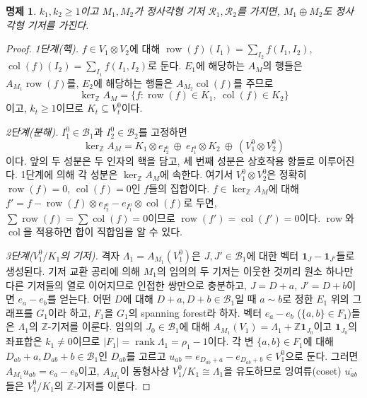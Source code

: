 \documentclass[11pt,a4paper]{article}
\theoremstyle{plain}
\newtheorem{proposition}[theorem]{명제}
\theoremstyle{definition}
\newcommand{\Z}{\mathbb Z}
\newcommand{\AM}{A_M}
\newcommand{\kerZ}{\ker_{\Z}\!A_M}
\newcommand{\bs}{\mathcal B}
\newcommand{\rank}{\operatorname{rank}}
\newcommand{\ind}{\mathbf 1}
\begin{document}
\begin{proposition}\label{prop:dsum}
$k_1,k_2\ge1$이고 $M_1,M_2$가 정사각형 기저 $\mathcal R_1,\mathcal R_2$를 가지면, $M_1\oplus M_2$도 정사각형 기저를 가진다.
\end{proposition}
\begin{proof}
\emph{1단계(핵).} $f\in V_1\otimes V_2$에 대해 $\operatorname{row}(f)(I_1)=\sum_{I_2}f(I_1,I_2)$, $\operatorname{col}(f)(I_2)=\sum_{I_1}f(I_1,I_2)$로 둔다. $E_1$에 해당하는 $\AM$의 행들은 $A_{M_1}\operatorname{row}(f)$를, $E_2$에 해당하는 행들은 $A_{M_2}\operatorname{col}(f)$를 주므로
\[
\kerZ=\{f:\operatorname{row}(f)\in K_1,\ \operatorname{col}(f)\in K_2\}
\]
이고, $k_t\ge1$이므로 $K_t\subseteq V_t^0$이다.

\emph{2단계(분해).} $I_1^0\in\bs_1$과 $I_2^0\in\bs_2$를 고정하면
\[
\kerZ=K_1\otimes e_{I_2^0}\ \oplus\ e_{I_1^0}\otimes K_2\ \oplus\ (V_1^0\otimes V_2^0)
\]
이다. 앞의 두 성분은 두 인자의 핵을 담고, 세 번째 성분은 상호작용 항들로 이루어진다. 1단계에 의해 각 성분은 $\kerZ$에 속한다. 여기서 $V_1^0\otimes V_2^0$은 정확히 $\operatorname{row}(f)=0$, $\operatorname{col}(f)=0$인 $f$들의 집합이다. $f\in\kerZ$에 대해 $f'=f-\operatorname{row}(f)\otimes e_{I_2^0}-e_{I_1^0}\otimes\operatorname{col}(f)$로 두면, $\sum\operatorname{row}(f)=\sum\operatorname{col}(f)=0$이므로 $\operatorname{row}(f')=\operatorname{col}(f')=0$이다. $\operatorname{row}$와 $\operatorname{col}$을 적용하면 합이 직합임을 알 수 있다.

\emph{3단계($V_1^0/K_1$의 기저).} 격자 $\Lambda_1=A_{M_1}(V_1^0)$은 $J,J'\in\bs_1$에 대한 벡터 $\ind_J-\ind_{J'}$들로 생성된다. 기저 교환 공리에 의해 $M_1$의 임의의 두 기저는 이웃한 것끼리 원소 하나만 다른 기저들의 열로 이어지므로 인접한 쌍만으로 충분하고, $J=D+a$, $J'=D+b$이면 $e_a-e_b$를 얻는다. 어떤 $D$에 대해 $D+a,D+b\in\bs_1$일 때 $a\sim b$로 정한 $E_1$ 위의 그래프를 $G_1$이라 하고, $F_1$을 $G_1$의 spanning forest라 하자. 벡터 $e_a-e_b$ ($\{a,b\}\in F_1$)들은 $\Lambda_1$의 $\Z$\nobreakdash-기저를 이룬다. 임의의 $J_0\in\bs_1$에 대해 $A_{M_1}(V_1)=\Lambda_1+\Z\ind_{J_0}$이고 $\ind_{J_0}$의 좌표합은 $k_1\neq0$이므로 $|F_1|=\rank\Lambda_1=\rho_1-1$이다. 각 변 $\{a,b\}\in F_1$에 대해 $D_{ab}+a,D_{ab}+b\in\bs_1$인 $D_{ab}$를 고르고 $u_{ab}=e_{D_{ab}+a}-e_{D_{ab}+b}\in V_1^0$으로 둔다. 그러면 $A_{M_1}u_{ab}=e_a-e_b$이고, $A_{M_1}$이 동형사상 $V_1^0/K_1\cong\Lambda_1$을 유도하므로 잉여류(coset) $\overline{u_{ab}}$들은 $V_1^0/K_1$의 $\Z$\nobreakdash-기저를 이룬다.


\end{proof}
\end{document}

